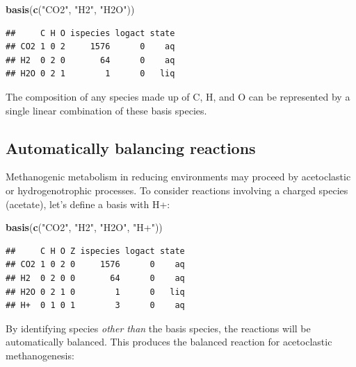 \documentclass[]{tufte-handout}
\newenvironment{Shaded}{}{}
\newcommand{\KeywordTok}[1]{\textcolor[rgb]{0.00,0.44,0.13}{\textbf{#1}}}
\newcommand{\DecValTok}[1]{\textcolor[rgb]{0.25,0.63,0.44}{#1}}
\newcommand{\StringTok}[1]{\textcolor[rgb]{0.25,0.44,0.63}{#1}}
\newcommand{\OperatorTok}[1]{\textcolor[rgb]{0.40,0.40,0.40}{#1}}
\newcommand{\NormalTok}[1]{#1}
\begin{document}
\begin{Shaded}
\begin{Highlighting}[]
\KeywordTok{basis}\NormalTok{(}\KeywordTok{c}\NormalTok{(}\StringTok{"CO2"}\NormalTok{, }\StringTok{"H2"}\NormalTok{, }\StringTok{"H2O"}\NormalTok{))}
\end{Highlighting}
\end{Shaded}

\begin{verbatim}
##     C H O ispecies logact state
## CO2 1 0 2     1576      0    aq
## H2  0 2 0       64      0    aq
## H2O 0 2 1        1      0   liq
\end{verbatim}

The composition of any species made up of C, H, and O can be represented
by a single linear combination of these basis species.

\subsection{Automatically balancing
reactions}\label{automatically-balancing-reactions}

Methanogenic metabolism in reducing environments may proceed by
acetoclastic or hydrogenotrophic processes. To consider reactions
involving a charged species (acetate), let's define a basis with H+:

\begin{Shaded}
\begin{Highlighting}[]
\KeywordTok{basis}\NormalTok{(}\KeywordTok{c}\NormalTok{(}\StringTok{"CO2"}\NormalTok{, }\StringTok{"H2"}\NormalTok{, }\StringTok{"H2O"}\NormalTok{, }\StringTok{"H+"}\NormalTok{))}
\end{Highlighting}
\end{Shaded}

\begin{verbatim}
##     C H O Z ispecies logact state
## CO2 1 0 2 0     1576      0    aq
## H2  0 2 0 0       64      0    aq
## H2O 0 2 1 0        1      0   liq
## H+  0 1 0 1        3      0    aq
\end{verbatim}

By identifying species \emph{other than} the basis species, the
reactions will be automatically balanced. This produces the balanced
reaction for acetoclastic methanogenesis:

\begin{Shaded}
\end{Shaded}
\end{document}
